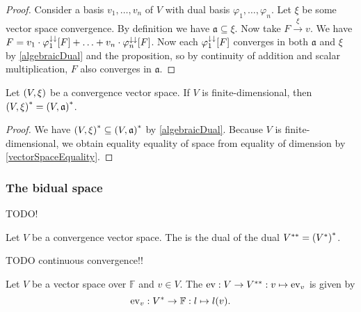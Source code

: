 \begin{proof}
Consider a basis $v_1, \ldots, v_n$ of $V$ with dual basis $\varphi_1, \ldots, \varphi_n$. Let $\xi$ be some vector space convergence. By definition we have $\mathfrak{a} \subseteq \xi$. Now take $F \overset{\xi}{\longrightarrow} v$. We have $F = v_1\cdot \varphi_1^{\downarrow\downarrow}[F] + \ldots + v_n\cdot \varphi_n^{\downarrow\downarrow}[F]$. Now each $\varphi_1^{\downarrow\downarrow}[F]$ converges in both $\mathfrak{a}$ and $\xi$ by \ref{algebraicDual} and the proposition, so by continuity of addition and scalar multiplication, $F$ also converges in $\mathfrak{a}$. 
\end{proof}
\begin{corollary}
Let $\left( V,\xi \right)$ be a convergence vector space. If $V$ is finite-dimensional, then $\left( V,\xi \right)^* = \left( V,\mathfrak{a} \right)^*$.
\end{corollary}
\begin{proof}
We have $\left( V,\xi \right)^* \subseteq \left( V,\mathfrak{a} \right)^*$ by \ref{algebraicDual}. Because $V$ is finite-dimensional, we obtain equality equality of space from equality of dimension by \ref{vectorSpaceEquality}.
\end{proof}

\subsubsection{The bidual space}
TODO!
\begin{definition}
Let $V$ be a convergence vector space. The  is the dual of the dual ${V}^{**} = {({V}^*)}^*$.
\end{definition}
TODO continuous convergence!!

\begin{definition}
Let $V$ be a vector space over $\mathbb{F}$ and $v\in V$. The  $\operatorname{ev}: V\to {V}^{**}: v\mapsto \operatorname{ev}_v$ is given by
\[ \operatorname{ev}_v: {V}^* \to \mathbb{F}: l\mapsto l(v). \]
\end{definition}


